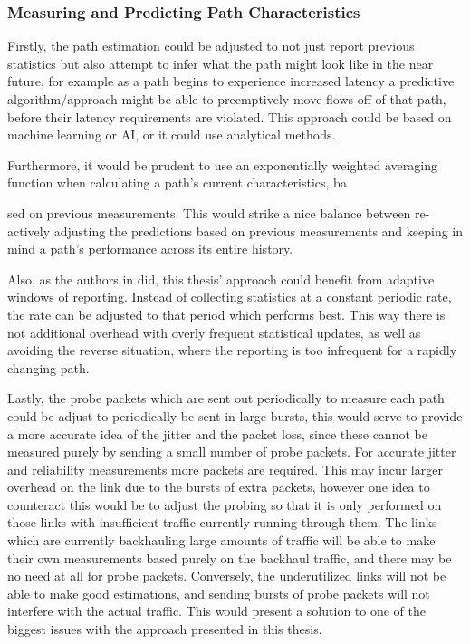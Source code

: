\subsubsection{Measuring and Predicting Path Characteristics}
Firstly, the path estimation could be adjusted to not just report previous statistics but also attempt to infer what the path might look like in the near future, for example as a path begins to experience increased latency a predictive algorithm/approach might be able to preemptively move flows off of that path, before their latency requirements are violated. This approach could be based on machine learning or AI, or it could use analytical methods.

Furthermore, it would be prudent to use an exponentially weighted averaging function when calculating a path's current characteristics, ba

sed on previous measurements. This would strike a nice balance between re-actively adjusting the predictions based on previous measurements and keeping in mind a path's performance across its entire history.

Also, as the authors in \cite{habib2007improving} did, this thesis' approach could benefit from adaptive windows of reporting. Instead of collecting statistics at a constant periodic rate, the rate can be adjusted to that period which performs best. This way there is not additional overhead with overly frequent statistical updates, as well as avoiding the reverse situation, where the reporting is too infrequent for a rapidly changing path.

Lastly, the probe packets which are sent out periodically to measure each path could be adjust to periodically be sent in large bursts, this would serve to provide a more accurate idea of the jitter and the packet loss, since these cannot be measured purely by sending a small number of probe packets. For accurate jitter and reliability measurements more packets are required. This may incur larger overhead on the link due to the bursts of extra packets, however one idea to counteract this would be to adjust the probing so that it is only performed on those links with insufficient traffic currently running through them. The links which are currently backhauling large amounts of traffic will be able to make their own measurements based purely on the backhaul traffic, and there may be no need at all for probe packets. Conversely, the underutilized links will not be able to make good estimations, and sending bursts of probe packets will not interfere with the actual traffic. This would present a solution to one of the biggest issues with the approach presented in this thesis.

